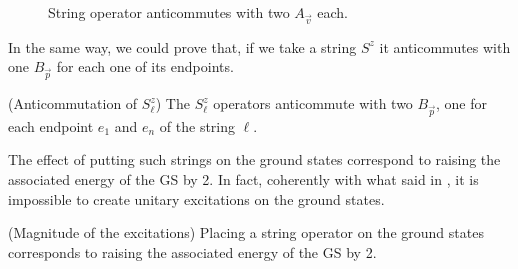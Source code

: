 \documentclass{Configuration_Files/PoliMi3i_thesis}
\begin{document}
\begin{figure}
\begin{center}
	\end{center}
	
	\caption{String operator anticommutes with two $A_{\vec{v}}$ each.}
	\label{fig:Av&string}
\end{figure}


In the same way, we could prove that, if we take a string $S^z$ it anticommutes with one $B_{\vec{p}} $ for each one of its endpoints.

\begin{proposition}(Anticommutation of $S^z_\ell$)
	The $S^z_\ell$ operators anticommute with two $B_{\vec{p}}$, one for each endpoint $e_1$ and $e_n$ of the string $\ell$.
\end{proposition}

The effect of putting such strings on the ground states correspond to raising the associated energy of the GS by 2. In fact, coherently with what said in {\cite{Her20}}, it is impossible to create unitary excitations on the ground states.

\begin{proposition}(Magnitude of the excitations)
	Placing a string operator on the ground states corresponds to raising the associated energy of the GS by 2.
\end{proposition}
\end{document}
